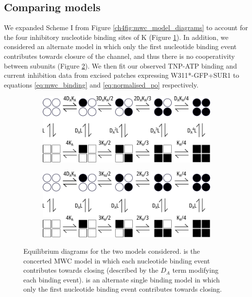 \subsection{Comparing models}

We expanded Scheme I from Figure \ref{ch4fig:mwc_model_diagrams} to account for the four inhibitory nucleotide binding sites of K\ATP{} (Figure \ref{ch4fig:model_expansion_1}).
In addition, we considered an alternate model in which only the first nucleotide binding event contributes towards closure of the channel, and thus there is no cooperativity between subunits (Figure \ref{ch4fig:model_expansion_2}).
We then fit our observed TNP-ATP binding and current inhibition data from excised patches expressing W311*-GFP+SUR1 to equations \ref{eq:mwc_binding} and \ref{eq:normalised_po} respectively.

\begin{figure}[hbtp]
	\centering
	\begin{subfigure}[t]{0.9\textwidth}
		\caption{}\label{ch4fig:model_expansion_1}
		\centering
		\includegraphics[width=\textwidth]{mwc_scheme_1_expansion.pdf}
	\end{subfigure}
	\vfill
	\begin{subfigure}[t]{0.9\textwidth}
		\caption{}\label{ch4fig:model_expansion_2}
		\centering
		\includegraphics[width=\textwidth]{mwc_scheme_1_expansion_2.pdf}
	\end{subfigure}
	\caption[Full model diagrams]{
	{\bf{}}
	Equilibrium diagrams for the two models considered.
	 is the concerted MWC model in which each nucleotide binding event contributes towards closing (described by the $D_A$ term modifying each binding event).
	 is an alternate single binding model in which only the first nucleotide binding event contributes towards closing.
	}\label{ch4fig:model_compare}
\end{figure}

